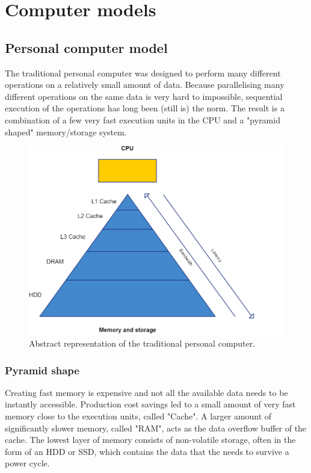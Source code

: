 \chapter{Computer models}

\section{Personal computer model}

\hspace{4mm}The traditional personal computer was designed to perform many different operations on a relatively small amount of data. Because parallelising many different operations on the same data is very hard to impossible, sequential execution of the operations has long been (still is) the norm. The result is a combination of a few very fast execution units in the CPU and a "pyramid shaped" memory/storage system. 

\begin{figure}[h!]
    \includegraphics[width=0.65\linewidth]{figures/Traditional-computer.png}
    \centering
    \caption{Abstract representation of the traditional personal computer.}
    \label{Piramid}
\end{figure}

\subsection*{Pyramid shape}

\hspace{4mm}Creating fast memory is expensive and not all the available data needs to be instantly accessible. Production cost savings led to a small amount of very fast memory close to the execution units, called "Cache". A larger amount of significantly slower memory, called "RAM", acts as the data overflow buffer of the cache. The lowest layer of memory consists of non-volatile storage, often in the form of an HDD or SSD, which contains the data that the needs to survive a power cycle.\vspace{5mm}

